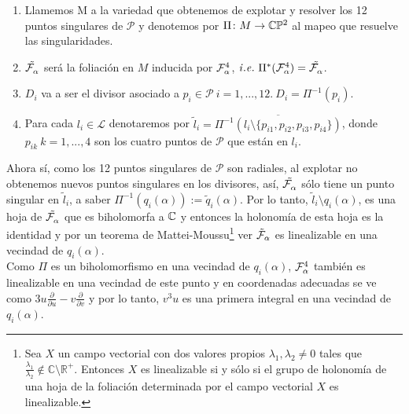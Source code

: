\begin{Not}
\label{Notimp}
\begin{enumerate}

\*

\item Llamemos M a la variedad que obtenemos de explotar y resolver los 12 puntos singulares de $\mathcal{P}$ y denotemos por $\Pi\colon M \rightarrow \CP$ al mapeo que resuelve las singularidades.

\item $\tilde{\Fol{\alpha}}$ será la foliación en $M$ inducida por $\Fol[4]{\alpha}$,  $\mathit{i.e.} \ \Pi^{*}(\Fol[4]{\alpha}) = \tilde{\Fol{\alpha}}$.

\item $D_{i}$ va a ser el divisor asociado a $p_{i} \in \mathcal{P} \ i=1,...,12. \ D_{i} = \Pi^{-1}(p_{i})$.

\item Para cada $l_{i} \in \mathcal{L}$ denotaremos por $\tilde{l}_{i} = \overline{\Pi^{-1}(l_{i} \setminus \{p_{i1}, p_{i2}, p_{i3}, p_{i4} \})}$, donde $p_{ik} \ k=1,...,4$ son los cuatro puntos de $\mathcal{P}$ que están en $l_{i}$.

\end{enumerate}
\end{Not}
Ahora sí, como los 12 puntos singulares de $\mathcal{P}$ son radiales, al explotar no obtenemos nuevos puntos singulares en los divisores, así, $\tilde{\Fol{\alpha}}$ sólo tiene un punto singular en $\tilde{l}_{i}$, a saber $\Pi^{-1}(q_{i}(\alpha)) := \tilde{q}_{i}(\alpha)$. Por lo tanto, $\tilde{l}_{i}\setminus q_{i}(\alpha)$, es una hoja de $\tilde{\Fol{\alpha}}$ que es biholomorfa a $\C$ y entonces la holonomía de esta hoja es la identidad y por un teorema de Mattei-Moussu\footnote{Sea $X$ un campo vectorial con dos valores propios $\lambda_{1},\lambda_{2}\neq 0$ tales que $\tfrac{\lambda_{1}}{\lambda_{2}}\notin\mathbb{C}\setminus\mathbb{R}^{+}$. Entonces $X$ es linealizable si y sólo si el grupo de holonomía de una hoja de la foliación determinada por el campo vectorial $X$ es linealizable.} ver \cite[teorema, 2 p.~482]{Mattei-Moussu} $\tilde{\Foli}_{\alpha}$ es linealizable en una vecindad de $q_{i}(\alpha)$.
\\

Como $\Pi$ es un biholomorfismo en una vecindad de $q_{i}(\alpha)$, $\Fol[4]{\alpha}$ también es linealizable en una vecindad de este punto y en coordenadas adecuadas se ve como $3u\frac{\partial}{\partial u} - v\frac{\partial}{\partial v}$ y por lo tanto, $v^{3}u$ es una primera integral en una vecindad de $q_{i}(\alpha)$.
\\

